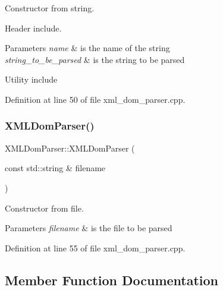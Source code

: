 Constructor from string. 

Header include.


\begin{DoxyParams}{Parameters}
{\em name} & is the name of the string \\
\hline
{\em string\+\_\+to\+\_\+be\+\_\+parsed} & is the string to be parsed\\
\hline
\end{DoxyParams}
Utility include 

Definition at line 50 of file xml\+\_\+dom\+\_\+parser.\+cpp.

\mbox{\label{classXMLDomParser_a263c55a28a8107839837a593c1af5350}} 
\subsubsection{\texorpdfstring{X\+M\+L\+Dom\+Parser()}{XMLDomParser()}\hspace{0.1cm}{\footnotesize\ttfamily [2/2]}}
{\footnotesize\ttfamily X\+M\+L\+Dom\+Parser\+::\+X\+M\+L\+Dom\+Parser (\begin{DoxyParamCaption}\item[{const std\+::string \&}]{filename }\end{DoxyParamCaption})\hspace{0.3cm}{\ttfamily [explicit]}}



Constructor from file. 


\begin{DoxyParams}{Parameters}
{\em filename} & is the file to be parsed \\
\hline
\end{DoxyParams}


Definition at line 55 of file xml\+\_\+dom\+\_\+parser.\+cpp.



\subsection{Member Function Documentation}
\mbox{\label{classXMLDomParser_a14355c872e4ffab4ab7e5d94a56c9d4e}} 
